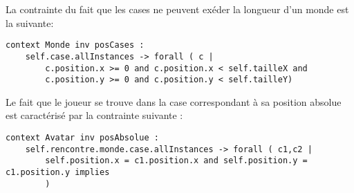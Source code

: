 La contrainte du fait que les cases ne peuvent exéder la longueur d'un monde est la suivante:

\begin{lstlisting}
context Monde inv posCases :
	self.case.allInstances -> forall ( c |
		c.position.x >= 0 and c.position.x < self.tailleX and
		c.position.y >= 0 and c.position.y < self.tailleY)
\end{lstlisting}

Le fait que le joueur se trouve dans la case correspondant à sa position absolue est caractérisé par la contrainte suivante :

\begin{lstlisting}
context Avatar inv posAbsolue :
	self.rencontre.monde.case.allInstances -> forall ( c1,c2 |
		self.position.x = c1.position.x and self.position.y = c1.position.y implies
		)
\end{lstlisting}